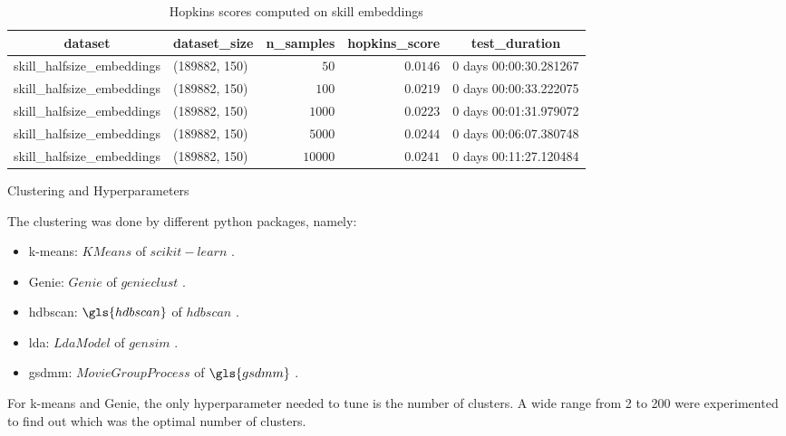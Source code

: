 \documentclass[a4paper,man,floatsintext,natbib,noextraspace]{apa6}
\makeatletter
\renewcommand{\subsubsection}{\@startsection{subsubsection}{3}
  {\z@}
  {\b@level@two@skip}
  {\e@level@two@skip}
  {\normalfont\normalsize\bfseries\itshape}}
\makeatother
\begin{document}
\begin{table}[!htbp]
    \caption{Hopkins scores computed on skill embeddings\label{tbl:hopkins_skill}} 
    \begin{center}
    \begin{tabular}{llrrl}
    \hline\hline
    \multicolumn{1}{c}{dataset}&\multicolumn{1}{c}{dataset\_size}&\multicolumn{1}{c}{n\_samples}&\multicolumn{1}{c}{hopkins\_score}&\multicolumn{1}{c}{test\_duration}\tabularnewline
    \hline
    skill\_halfsize\_embeddings&(189882, 150)&$   50$&$0.0146$&0 days 00:00:30.281267\tabularnewline
    skill\_halfsize\_embeddings&(189882, 150)&$  100$&$0.0219$&0 days 00:00:33.222075\tabularnewline
    skill\_halfsize\_embeddings&(189882, 150)&$ 1000$&$0.0223$&0 days 00:01:31.979072\tabularnewline
    skill\_halfsize\_embeddings&(189882, 150)&$ 5000$&$0.0244$&0 days 00:06:07.380748\tabularnewline
    skill\_halfsize\_embeddings&(189882, 150)&$10000$&$0.0241$&0 days 00:11:27.120484\tabularnewline
    \hline
    \end{tabular}\end{center}
    \end{table}

\subsubsection{Clustering and Hyperparameters}

The clustering was done by different python packages, namely:

\begin{itemize}
    \item k-means: $KMeans$ of $scikit-learn$ \citep{pedregosaScikitlearnMachineLearning2011}.
    \item Genie: $Genie$ of $genieclust$ \citep{gagolewskiGenieNewFast2016a}.
    \item \gls{hdbscan}: $\gls{hdbscan}$ of $hdbscan$ \citep{mcinnesHdbscanHierarchicalDensity2017}.
    \item \gls{lda}: $LdaModel$ of $gensim$ \citep{rehurekSoftwareFrameworkTopic2010a}.
    \item \gls{gsdmm}: $MovieGroupProcess$ of $\gls{gsdmm}$ \citep{yinDirichletMultinomialMixture2014}.
\end{itemize}

For k-means and Genie, the only hyperparameter needed to tune is the number of clusters. A wide range from 2 to 200 were experimented to find out which was the optimal number of clusters.
\end{document}
